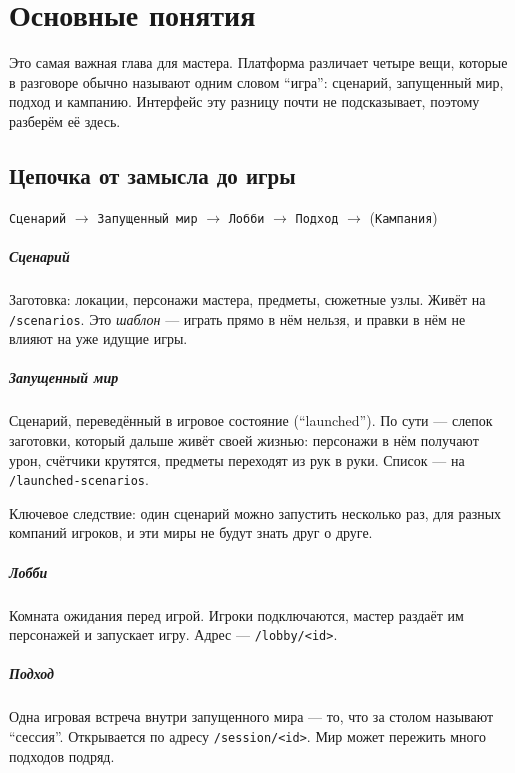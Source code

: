 \chapter{Основные понятия}
\label{ch:concepts}

Это самая важная глава для мастера. Платформа различает четыре вещи, которые в разговоре обычно называют одним словом ``игра'': сценарий, запущенный мир, подход и кампанию. Интерфейс эту разницу почти не подсказывает, поэтому разберём её здесь.

\section{Цепочка от замысла до игры}
\label{sec:concepts:chain}

\begin{center}
\texttt{Сценарий} $\rightarrow$ \texttt{Запущенный мир} $\rightarrow$ \texttt{Лобби} $\rightarrow$ \texttt{Подход} $\rightarrow$ (\texttt{Кампания})
\end{center}

\paragraph{Сценарий}
Заготовка: локации, персонажи мастера, предметы, сюжетные узлы. Живёт на \texttt{/scenarios}. Это \emph{шаблон} --- играть прямо в нём нельзя, и правки в нём не влияют на уже идущие игры.

\paragraph{Запущенный мир}
Сценарий, переведённый в игровое состояние (``launched''). По сути --- слепок заготовки, который дальше живёт своей жизнью: персонажи в нём получают урон, счётчики крутятся, предметы переходят из рук в руки. Список --- на \texttt{/launched-scenarios}.

Ключевое следствие: один сценарий можно запустить несколько раз, для разных компаний игроков, и эти миры не будут знать друг о друге.

\paragraph{Лобби}
Комната ожидания перед игрой. Игроки подключаются, мастер раздаёт им персонажей и запускает игру. Адрес --- \texttt{/lobby/<id>}.

\paragraph{Подход}
Одна игровая встреча внутри запущенного мира --- то, что за столом называют ``сессия''. Открывается по адресу \texttt{/session/<id>}. Мир может пережить много подходов подряд.

